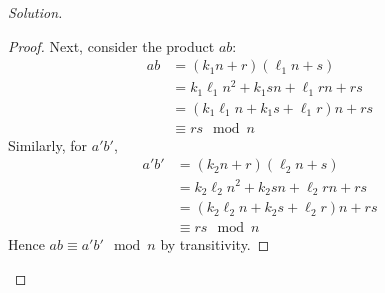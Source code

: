 \documentclass[12pt]{article}
\newenvironment{solution}
  {\renewcommand\qedsymbol{$\blacksquare$}\begin{proof}[Solution]}
{\end{proof}}
\begin{document}
\begin{solution}
\begin{proof}
    Next, consider the product $ab$:
    \begin{align*}
      ab &= (k_1n+r)(\ell_1n+s) \\
      &= k_1\ell_1n^2 + k_1sn + \ell_1rn + rs \\
      &= (k_1\ell_1n + k_1s + \ell_1r)n + rs \\
      &\equiv rs \mod n 
    \end{align*}
    Similarly, for $a'b'$, 
    \begin{align*}
      a'b' &= (k_2n+r)(\ell_2n+s) \\
      &= k_2\ell_2n^2 + k_2sn + \ell_2rn + rs \\
      &= (k_2\ell_2n + k_2s + \ell_2r)n + rs \\
      &\equiv rs \mod n 
    \end{align*}
    Hence $ab\equiv a'b'\mod n$ by transitivity.
  \end{proof}
\end{solution}
\end{document}
